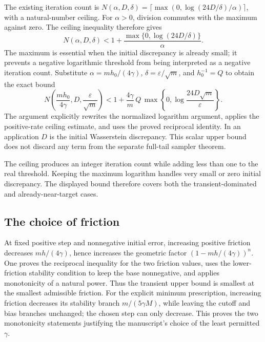 \documentclass[11pt,a4paper]{report}
\begin{document}
The existing iteration count is \(N(\alpha,D,\delta)=\lceil\max(0,\log(24D/\delta)/\alpha)\rceil\), with a natural-number ceiling. For \(\alpha>0\), division commutes with the maximum against zero. The ceiling inequality therefore gives \[N(\alpha,D,\delta)<1+\frac{\max\{0,\log(24D/\delta)\}}{\alpha}.\] The maximum is essential when the initial discrepancy is already small; it prevents a negative logarithmic threshold from being interpreted as a negative iteration count. Substitute \(\alpha=mh_0/(4\gamma)\), \(\delta=\varepsilon/\sqrt m\), and \(h_0^{-1}=Q\) to obtain the exact bound \[N\!\left(\frac{mh_0}{4\gamma},D,\frac{\varepsilon}{\sqrt m}\right)<1+\frac{4\gamma}{m}\,Q\,\max\!\left\{0,\log\frac{24D\sqrt m}{\varepsilon}\right\}.\] The argument explicitly rewrites the normalized logarithm argument, applies the positive-rate ceiling estimate, and uses the proved reciprocal identity. In an application \(D\) is the initial Wasserstein discrepancy. This scalar upper bound does not discard any term from the separate full-tail sampler theorem.



The ceiling produces an integer iteration count while adding less than one to the real threshold. Keeping the maximum logarithm handles very small or zero initial discrepancy. The displayed bound therefore covers both the transient-dominated and already-near-target cases.

\subsection{\texorpdfstring{The choice of friction}{The choice of friction}}
\label{report-step-KineticLangevin-SecondOrderComplexity-lean-6}


At fixed positive step and nonnegative initial error, increasing positive friction decreases \(mh/(4\gamma)\), hence increases the geometric factor \((1-mh/(4\gamma))^n\). One proves the reciprocal inequality for the two friction values, uses the lower-friction stability condition to keep the base nonnegative, and applies monotonicity of a natural power. Thus the transient upper bound is smallest at the smallest admissible friction. For the explicit minimum prescription, increasing friction decreases its stability branch \(m/(5\gamma M)\), while leaving the cutoff and bias branches unchanged; the chosen step can only decrease. This proves the two monotonicity statements justifying the manuscript's choice of the least permitted \(\gamma\).
\end{document}
